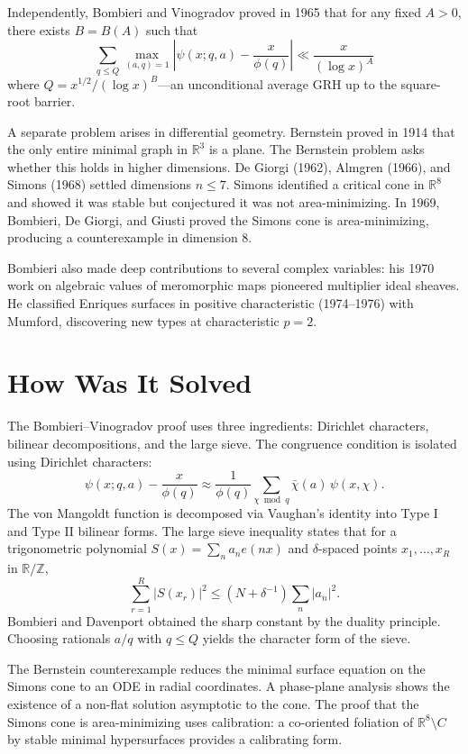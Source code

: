 Independently, Bombieri and Vinogradov proved in 1965 that for any
fixed $A > 0$, there exists $B = B(A)$ such that
\[
\sum_{q \le Q} \max_{(a,q)=1} \left| \psi(x; q, a) - \frac{x}{\phi(q)} \right| \ll \frac{x}{(\log x)^A}
\]
where $Q = x^{1/2} / (\log x)^B$---an unconditional average GRH up to
the square-root barrier.

A separate problem arises in differential geometry. Bernstein proved in
1914 that the only entire minimal graph in $\mathbb{R}^3$ is a plane.
The Bernstein problem asks whether this holds in higher dimensions. De
Giorgi (1962), Almgren (1966), and Simons (1968) settled dimensions
$n \le 7$. Simons identified a critical cone in $\mathbb{R}^8$ and
showed it was stable but conjectured it was not area-minimizing. In
1969, Bombieri, De Giorgi, and Giusti proved the Simons cone is
area-minimizing, producing a counterexample in dimension 8.

Bombieri also made deep contributions to several complex variables: his
1970 work on algebraic values of meromorphic maps pioneered multiplier
ideal sheaves. He classified Enriques surfaces in positive
characteristic (1974--1976) with Mumford, discovering new types at
characteristic $p = 2$.

\section{How Was It Solved}

The Bombieri--Vinogradov proof uses three ingredients: Dirichlet
characters, bilinear decompositions, and the large sieve. The
congruence condition is isolated using Dirichlet characters:
\[
\psi(x; q, a) - \frac{x}{\phi(q)} \approx \frac{1}{\phi(q)} \sum_{\chi \bmod q} \bar{\chi}(a)\, \psi(x, \chi).
\]
The von Mangoldt function is decomposed via Vaughan's identity into
Type I and Type II bilinear forms. The large sieve inequality states
that for a trigonometric polynomial $S(x) = \sum_n a_n e(nx)$ and
$\delta$-spaced points $x_1, \dots, x_R$ in $\mathbb{R}/\mathbb{Z}$,
\[
\sum_{r=1}^R |S(x_r)|^2 \le (N + \delta^{-1}) \sum_n |a_n|^2.
\]
Bombieri and Davenport obtained the sharp constant by the duality
principle. Choosing rationals $a/q$ with $q \le Q$ yields the character
form of the sieve.

The Bernstein counterexample reduces the minimal surface equation on
the Simons cone to an ODE in radial coordinates. A phase-plane analysis
shows the existence of a non-flat solution asymptotic to the cone. The
proof that the Simons cone is area-minimizing uses calibration: a
co-oriented foliation of $\mathbb{R}^8 \setminus C$ by stable minimal
hypersurfaces provides a calibrating form.

